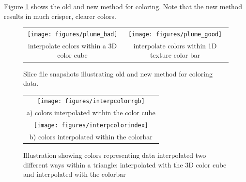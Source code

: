 \documentclass[11pt,twoside]{book}
\newcommand{\figoptions}{htp}
\begin{document}
Figure \ref{fignewslice} shows the old and new method for coloring.  Note that the new method results in much crisper, clearer colors.
\begin{figure}[\figoptions]
\begin{center}
\begin{tabular}{cc}
\texttt{[image: figures/plume\_bad]}&\texttt{[image: figures/plume\_good]}\\
interpolate colors within a 3D color cube&interpolate colors within 1D texture color bar\\
\end{tabular}
\caption [Slice file snapshots illustrating old and new method for
coloring data.] {Slice file snapshots illustrating old and new
method for coloring data.}
\label{fignewslice}%
\end{center}
\end{figure}



\begin{figure}[\figoptions]
\begin{center}
\begin{tabular}{c}
\texttt{[image: figures/interpcolorrgb]}\\
a) colors interpolated within the color cube\\
\texttt{[image: figures/interpcolorindex]}\\
b) colors interpolated within the colorbar\\
\end{tabular}
\end{center}
\caption[Color interpolation examples]
{Illustration showing colors representing data interpolated two different ways within a triangle: interpolated with the 3D color cube and interpolated with the colorbar}
\label{colorinterp}%
\end{figure}

%
%
\end{document}

